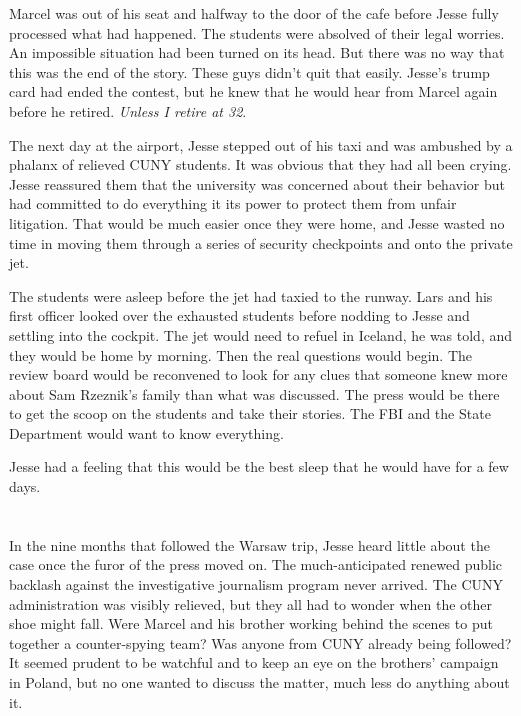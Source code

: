 \documentclass[12pt]{book}
\begin{document}
Marcel was out of his seat and halfway to the door of the cafe before Jesse fully processed what had happened.  The students were absolved of their legal worries.  An impossible situation had been turned on its head.  But there was no way that this was the end of the story.  These guys didn't quit that easily.  Jesse's trump card had ended the contest, but he knew that he would hear from Marcel again before he retired.  \emph{Unless I retire at 32}.


The next day at the airport, Jesse stepped out of his taxi and was ambushed by a phalanx of relieved CUNY students.  It was obvious that they had all been crying.  Jesse reassured them that the university was concerned about their behavior but had committed to do everything it its power to protect them from unfair litigation.  That would be much easier once they were home, and Jesse wasted no time in moving them through a series of security checkpoints and onto the private jet.

The students were asleep before the jet had taxied to the runway.  Lars and his first officer looked over the exhausted students before nodding to Jesse and settling into the cockpit.  The jet would need to refuel in Iceland, he was told, and they would be home by morning.  Then the real questions would begin.  The review board would be reconvened to look for any clues that someone knew more about Sam Rzeznik's family than what was discussed.  The press would be there to get the scoop on the students and take their stories.  The FBI and the State Department would want to know everything.

Jesse had a feeling that this would be the best sleep that he would have for a few days.

\chapter{}

In the nine months that followed the Warsaw trip, Jesse heard little about the case once the furor of the press moved on.  The much-anticipated renewed public backlash against the investigative journalism program never arrived.  The CUNY administration was visibly relieved, but they all had to wonder when the other shoe might fall.  Were Marcel and his brother working behind the scenes to put together a counter-spying team?  Was anyone from CUNY already being followed?  It seemed prudent to be watchful and to keep an eye on the brothers' campaign in Poland, but no one wanted to discuss the matter, much less do anything about it.
\end{document}
